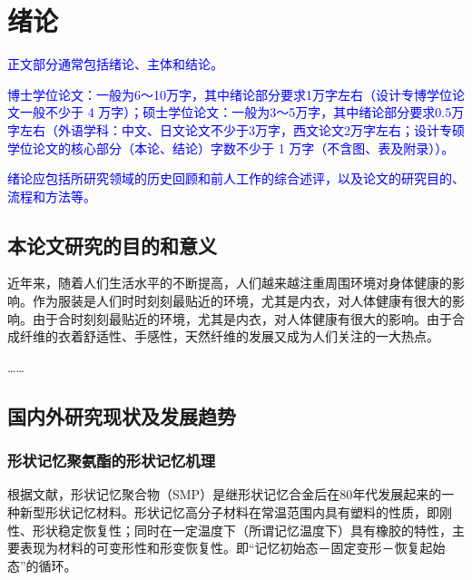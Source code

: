 
\chapter{绪论}

\textcolor{blue}{正文部分通常包括绪论、主体和结论。}

\textcolor{blue}{
  博士学位论文：一般为6～10万字，其中绪论部分要求1万字左右（设计专博学位论文一般不少于 4 万字）；硕士学位论文：一般为3～5万字，其中绪论部分要求0.5万字左右（外语学科：中文、日文论文不少于3万字，西文论文2万字左右；设计专硕学位论文的核心部分（本论、结论）字数不少于 1 万字（不含图、表及附录））。
}

\textcolor{blue}{
  绪论应包括所研究领域的历史回顾和前人工作的综合述评，以及论文的研究目的、流程和方法等。
}


\label{chap:intro}
\section{本论文研究的目的和意义}

近年来，随着人们生活水平的不断提高，人们越来越注重周围环境对身体健康的影响。作为服装是人们时时刻刻最贴近的环境，尤其是内衣，对人体健康有很大的影响。由于合时刻刻最贴近的环境，尤其是内衣，对人体健康有很大的影响。由于合成纤维的衣着舒适性、手感性，天然纤维的发展又成为人们关注的一大热点。

……\cite{Takahashi1996Structure,Xia2002Analysis,Jiang1989,Mao2000Motion,Feng1998}

\section{国内外研究现状及发展趋势}

\subsection{形状记忆聚氨酯的形状记忆机理}

根据文献\parencite{Jiang2005Size}，形状记忆聚合物（SMP）是继形状记忆合金后在80年代发展起来的一种新型形状记忆材料。形状记忆高分子材料在常温范围内具有塑料的性质，即刚性、形状稳定恢复性；同时在一定温度下（所谓记忆温度下）具有橡胶的特性，主要表现为材料的可变形性和形变恢复性。即“记忆初始态－固定变形－恢复起始态”的循环。

